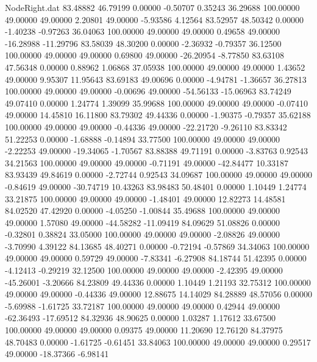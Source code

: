 \begin{filecontents}{NodeRight.dat}
  83.48882   46.79199    0.00000    -0.50707    0.35243   36.29688  100.00000   49.00000   49.00000    2.20801   49.00000   -5.93586    4.12564
  83.52957   48.50342    0.00000    -1.40238   -0.97263   36.04063  100.00000   49.00000   49.00000    0.49658   49.00000  -16.28988  -11.29796
  83.58039   48.30200    0.00000    -2.36932   -0.79357   36.12500  100.00000   49.00000   49.00000    0.69800   49.00000  -26.20954   -8.77850
  83.63108   47.56348    0.00000     0.88962    1.06868   37.05938  100.00000   49.00000   49.00000    1.43652   49.00000    9.95307   11.95643
  83.69183   49.00696    0.00000    -4.94781   -1.36657   36.27813  100.00000   49.00000   49.00000   -0.00696   49.00000  -54.56133  -15.06963
  83.74249   49.07410    0.00000     1.24774    1.39099   35.99688  100.00000   49.00000   49.00000   -0.07410   49.00000   14.45810   16.11800
  83.79302   49.44336    0.00000    -1.90375   -0.79357   35.62188  100.00000   49.00000   49.00000   -0.44336   49.00000  -22.21720   -9.26110
  83.83342   51.22253    0.00000    -1.68888   -0.14894   33.77500  100.00000   49.00000   49.00000   -2.22253   49.00000  -19.34065   -1.70567
  83.88388   49.71191    0.00000    -3.83763    0.92543   34.21563  100.00000   49.00000   49.00000   -0.71191   49.00000  -42.84477   10.33187
  83.93439   49.84619    0.00000    -2.72744    0.92543   34.09687  100.00000   49.00000   49.00000   -0.84619   49.00000  -30.74719   10.43263
  83.98483   50.48401    0.00000     1.10449    1.24774   33.21875  100.00000   49.00000   49.00000   -1.48401   49.00000   12.82273   14.48581
  84.02520   47.42920    0.00000    -4.05250   -1.00844   35.49688  100.00000   49.00000   49.00000    1.57080   49.00000  -44.58282  -11.09419
  84.09629   51.08826    0.00000    -0.32801    0.38824   33.05000  100.00000   49.00000   49.00000   -2.08826   49.00000   -3.70990    4.39122
  84.13685   48.40271    0.00000    -0.72194   -0.57869   34.34063  100.00000   49.00000   49.00000    0.59729   49.00000   -7.83341   -6.27908
  84.18744   51.42395    0.00000    -4.12413   -0.29219   32.12500  100.00000   49.00000   49.00000   -2.42395   49.00000  -45.26001   -3.20666
  84.23809   49.44336    0.00000     1.10449    1.21193   32.75312  100.00000   49.00000   49.00000   -0.44336   49.00000   12.88675   14.14029
  84.28889   48.57056    0.00000    -5.69988   -1.61725   33.72187  100.00000   49.00000   49.00000    0.42944   49.00000  -62.36493  -17.69512
  84.32936   48.90625    0.00000     1.03287    1.17612   33.67500  100.00000   49.00000   49.00000    0.09375   49.00000   11.20690   12.76120
  84.37975   48.70483    0.00000    -1.61725   -0.61451   33.84063  100.00000   49.00000   49.00000    0.29517   49.00000  -18.37366   -6.98141

\end{filecontents}
